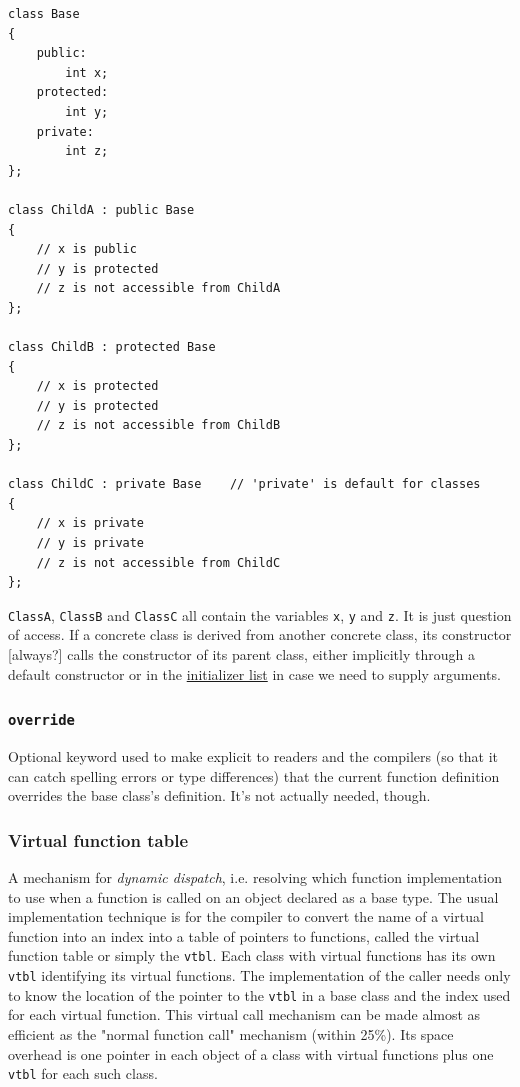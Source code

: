 \documentclass[table, xcdraw]{article}%
\begin{document}
\begin{verbatim}
class Base
{
    public:
        int x;
    protected:
        int y;
    private:
        int z;
};

class ChildA : public Base
{
    // x is public
    // y is protected
    // z is not accessible from ChildA
};

class ChildB : protected Base
{
    // x is protected
    // y is protected
    // z is not accessible from ChildB
};

class ChildC : private Base    // 'private' is default for classes
{
    // x is private
    // y is private
    // z is not accessible from ChildC
};
\end{verbatim}

\texttt{ClassA}, \texttt{ClassB} and \texttt{ClassC} all contain the variables \texttt{x}, \texttt{y} and \texttt{z}. It is just question of access. If a concrete class is derived from another concrete class, its constructor [always?] calls the constructor of its parent class, either implicitly through a default constructor or in the \hyperref[initializerlist]{initializer list} in case we need to supply arguments.

\subsubsection{\texttt{override}}

Optional keyword used to make explicit to readers and the compilers (so that it can catch spelling errors or type differences) that the current function definition overrides the base class's definition. It's not actually needed, though.

\subsubsection{Virtual function table}

A mechanism for \textit{dynamic dispatch}, i.e. resolving which function implementation to use when a function is called on an object declared as a base type. The usual implementation technique is for the compiler to convert the name of a virtual function into an index into a table of pointers to functions, called the virtual function table or simply the \texttt{vtbl}. Each class with virtual functions has its own \texttt{vtbl} identifying its virtual functions. The implementation of the caller needs only to know the location of the pointer to the \texttt{vtbl} in a base class and the index used for each virtual function. This virtual call mechanism can be made almost as efficient as the "normal function call" mechanism (within 25\%). Its space overhead is one pointer in each object of a class with virtual functions plus one \texttt{vtbl} for each such class.
\end{document}
